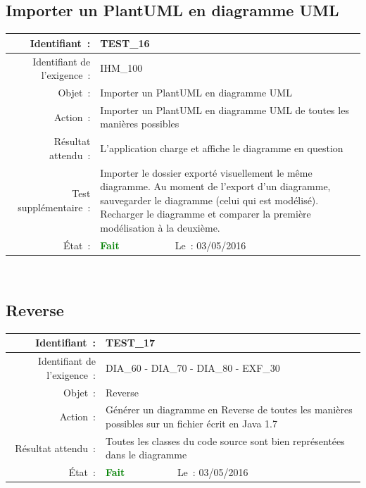 \documentclass[hidelinks, a4paper,11pt,twoside,final]{article}
\begin{document}
    \subsection*{Importer un PlantUML en diagramme UML}
    \begin{tabular}{|r|p{5cm}|p{5cm}|}\hline
    {Identifiant~:} & \multicolumn{2}{|p{10cm}|}{TEST\_16} \\\hline
    {Identifiant de l’exigence~:} & \multicolumn{2}{|p{10cm}|}{IHM\_100} \\\hline
        {Objet~:} & \multicolumn{2}{|p{10cm}|}{Importer un PlantUML en diagramme UML} \\\hline
        {Action~:} & \multicolumn{2}{|p{10cm}|}{Importer un PlantUML en diagramme UML de toutes les manières possibles} \\\hline
        {Résultat attendu~:} & \multicolumn{2}{|p{10cm}|}{L’application charge et affiche le diagramme en question} \\\hline
        {Test supplémentaire~:} & \multicolumn{2}{|p{10cm}|}{Importer le dossier exporté visuellement le même diagramme.
							    Au moment de l’export d’un diagramme, sauvegarder le diagramme (celui qui est modélisé).
							    Recharger le diagramme et comparer la première modélisation à la deuxième. } \\\hline
        {État~:} & {\textcolor{green}{\textbf{Fait}}} & {Le~: 03/05/2016 } \\\hline
    \end{tabular}
    \\
    \newline

    
    \subsection*{Reverse}
    \begin{tabular}{|r|p{5cm}|p{5cm}|}\hline
    {Identifiant~:} & \multicolumn{2}{|p{10cm}|}{TEST\_17} \\\hline
    {Identifiant de l’exigence~:} & \multicolumn{2}{|p{10cm}|}{DIA\_60 - DIA\_70 - DIA\_80 - EXF\_30} \\\hline
        {Objet~:} & \multicolumn{2}{|p{10cm}|}{Reverse} \\\hline
        {Action~:} & \multicolumn{2}{|p{10cm}|}{Générer un diagramme en Reverse de toutes les manières possibles sur un fichier écrit en Java 1.7} \\\hline
        {Résultat attendu~:} & \multicolumn{2}{|p{10cm}|}{Toutes les classes du code source sont bien représentées dans le diagramme} \\\hline
        {État~:} & {\textcolor{green}{\textbf{Fait}}} & {Le~: 03/05/2016 } \\\hline
    \end{tabular}
    \\
    \newpage
\end{document}

